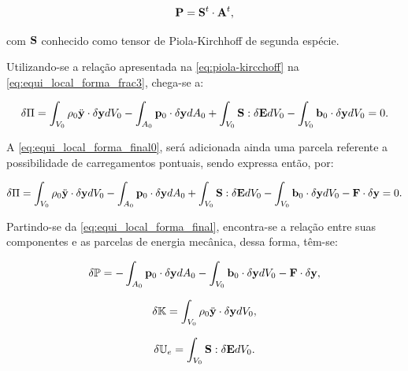 \begin{align}
\mathbf{P} = \mathbf{S}^{t} \cdot \mathbf{A}^{t}, \label{eq:piola-kircchoff}
\end{align}

\noindent com $\mathbf{S}$ conhecido como tensor de Piola-Kirchhoff de segunda espécie. 

Utilizando-se a relação apresentada na \autoref{eq:piola-kircchoff} na \autoref{eq:equi_local_forma_frac3}, chega-se a:

\begin{align}
\delta\Pi = \int_{V_{0}} \rho_{0} \ddot{\mathbf{y}} \cdot \delta\mathbf{y} dV_{0} - \int_{A_{0}} \mathbf{p}_{0} \cdot \delta\mathbf{y} dA_{0} +  \int_{V_{0}} \mathbf{S} : \delta\mathbf{E} dV_{0} - \int_{V_{0}}  \mathbf{b}_0 \cdot \delta\mathbf{y} dV_{0} = 0.
\label{eq:equi_local_forma_final0}
\end{align}

A \autoref{eq:equi_local_forma_final0}, será adicionada ainda uma parcela referente a possibilidade de carregamentos pontuais, sendo expressa então, por:

\begin{align}
	\delta\Pi = \int_{V_{0}} \rho_{0} \ddot{\mathbf{y}} \cdot \delta\mathbf{y} dV_{0} - \int_{A_{0}} \mathbf{p}_{0} \cdot \delta\mathbf{y} dA_{0} +  \int_{V_{0}} \mathbf{S} : \delta\mathbf{E} dV_{0} - \int_{V_{0}}  \mathbf{b}_0 \cdot \delta\mathbf{y} dV_{0} - \mathbf{F} \cdot \delta\mathbf{y} = 0.
	\label{eq:equi_local_forma_final}
\end{align}

Partindo-se da \autoref{eq:equi_local_forma_final}, encontra-se a relação entre suas componentes e as parcelas de energia mecânica, dessa forma, têm-se:

\begin{align}
	 \delta\mathbb{P} = - \int_{A_{0}} \mathbf{p}_{0} \cdot \delta\mathbf{y} dA_{0} - \int_{V_{0}}  \mathbf{b}_0 \cdot \delta\mathbf{y} dV_{0} - \mathbf{F} \cdot \delta\mathbf{y},
\end{align}

\begin{align}
	\delta\mathbb{K} = \int_{V_{0}} \rho_{0} \ddot{\mathbf{y}} \cdot \delta\mathbf{y} dV_{0},
\end{align}

\begin{align}
	 \delta\mathbb{U}_e = \int_{V_{0}} \mathbf{S} : \delta\mathbf{E} dV_{0}.
\end{align}


